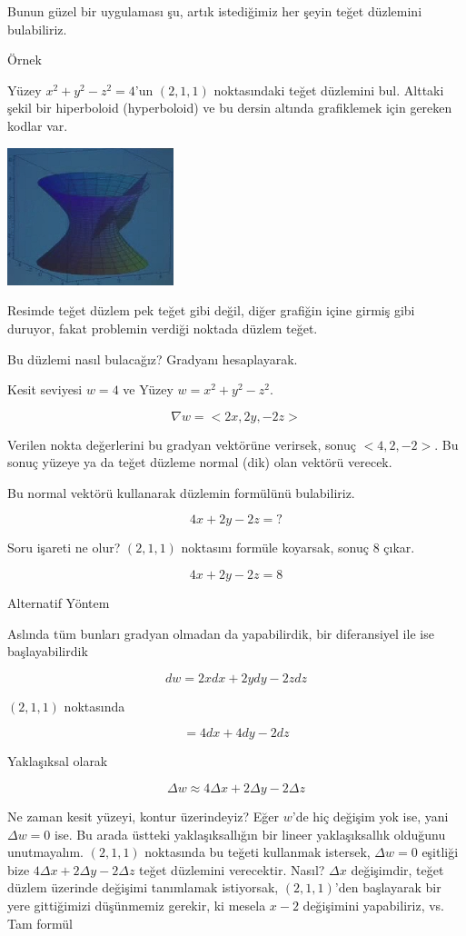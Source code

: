 \documentclass[12pt,fleqn]{article}\usepackage{../../common}
\begin{document}
Bunun güzel bir uygulaması şu, artık istediğimiz her şeyin teğet düzlemini
bulabiliriz. 

Örnek

Yüzey $x^2 + y^2 - z^2 = 4$'un $(2,1,1)$ noktasındaki teğet düzlemini
bul. Alttaki şekil bir hiperboloid (hyperboloid) ve bu dersin altında
grafiklemek için gereken kodlar var.

\begin{center}
\includegraphics[height=4cm]{12_5.png}
\end{center}

Resimde teğet düzlem pek teğet gibi değil, diğer grafiğin içine girmiş gibi
duruyor, fakat problemin verdiği noktada düzlem teğet. 

Bu düzlemi nasıl bulacağız? Gradyanı hesaplayarak. 

Kesit seviyesi $w=4$ ve Yüzey $w = x^2 + y^2 - z^2$. 

$$ \nabla w = <2x, 2y, -2z> $$

Verilen nokta değerlerini bu gradyan vektörüne verirsek, sonuç
$< 4,2,-2 >$. Bu sonuç yüzeye ya da teğet düzleme normal (dik) olan 
vektörü verecek. 

Bu normal vektörü kullanarak düzlemin formülünü bulabiliriz. 

$$ 4x + 2y - 2z = ? $$

Soru işareti ne olur? $(2,1,1)$ noktasını formüle koyarsak, sonuç 8 çıkar.

$$ 4x + 2y - 2z = 8 $$

Alternatif Yöntem

Aslında tüm bunları gradyan olmadan da yapabilirdik, bir diferansiyel ile
ise başlayabilirdik

$$ dw = 2x dx + 2y dy -2z dz $$

$(2,1,1)$ noktasında

$$ = 4dx + 4dy - 2dz $$

Yaklaşıksal olarak 

$$ \Delta w \approx 4 \Delta x + 2\Delta y - 2\Delta z  $$

Ne zaman kesit yüzeyi, kontur üzerindeyiz? Eğer $w$'de hiç değişim yok ise, yani
$\Delta w = 0$ ise. Bu arada üstteki yaklaşıksallığın bir lineer yaklaşıksallık
olduğunu unutmayalım. $(2,1,1)$ noktasında bu teğeti kullanmak istersek, $\Delta
w = 0$ eşitliği bize $4 \Delta x + 2\Delta y - 2\Delta z $ teğet düzlemini
verecektir. Nasıl? $\Delta x$ değişimdir, teğet düzlem üzerinde değişimi
tanımlamak istiyorsak, $(2,1,1)$'den başlayarak bir yere gittiğimizi düşünmemiz
gerekir, ki mesela $x-2$ değişimini yapabiliriz, vs. Tam formül
\end{document}
